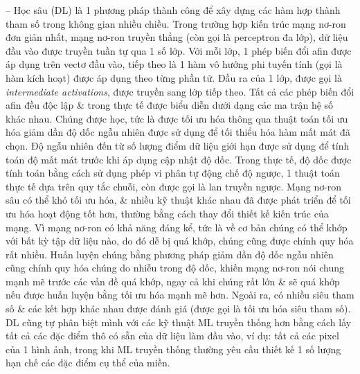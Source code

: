 \documentclass{article}
\begin{document}
\begin{itemize}
\begin{itemize}
\begin{itemize}
            -- Học sâu (DL) là 1 phương pháp thành công để xây dựng các hàm hợp thành tham số trong không gian nhiều chiều. Trong trường hợp kiến trúc mạng nơ-ron đơn giản nhất, mạng nơ-ron truyền thẳng (còn gọi là perceptron đa lớp), dữ liệu đầu vào được truyền tuần tự qua 1 số lớp. Với mỗi lớp, 1 phép biến đổi afin được áp dụng trên vectơ đầu vào, tiếp theo là 1 hàm vô hướng phi tuyến tính (gọi là hàm kích hoạt) được áp dụng theo từng phần tử. Đầu ra của 1 lớp, được gọi là {\it intermediate activations}, được truyền sang lớp tiếp theo. Tất cả các phép biến đổi afin đều độc lập \& trong thực tế được biểu diễn dưới dạng các ma trận hệ số khác nhau. Chúng được học, tức là được tối ưu hóa thông qua thuật toán tối ưu hóa giảm dần độ dốc ngẫu nhiên được sử dụng để tối thiểu hóa hàm mất mát đã chọn. Độ ngẫu nhiên đến từ số lượng điểm dữ liệu giới hạn được sử dụng để tính toán độ mất mát trước khi áp dụng cập nhật độ dốc. Trong thực tế, độ dốc được tính toán bằng cách sử dụng phép vi phân tự động chế độ ngược, 1 thuật toán thực tế dựa trên quy tắc chuỗi, còn được gọi là lan truyền ngược. Mạng nơ-ron sâu có thể khó tối ưu hóa, \& nhiều kỹ thuật khác nhau đã được phát triển để tối ưu hóa hoạt động tốt hơn, thường bằng cách thay đổi thiết kế kiến trúc của mạng. Vì mạng nơ-ron có khả năng đáng kể, tức là về cơ bản chúng có thể khớp với bất kỳ tập dữ liệu nào, do đó dễ bị quá khớp, chúng cũng được chính quy hóa rất nhiều. Huấn luyện chúng bằng phương pháp giảm dần độ dốc ngẫu nhiên cũng chính quy hóa chúng do nhiễu trong độ dốc, khiến mạng nơ-ron nói chung mạnh mẽ trước các vấn đề quá khớp, ngay cả khi chúng rất lớn \& sẽ quá khớp nếu được huấn luyện bằng tối ưu hóa mạnh mẽ hơn. Ngoài ra, có nhiều siêu tham số \& các kết hợp khác nhau được đánh giá (được gọi là tối ưu hóa siêu tham số). DL cũng tự phân biệt mình với các kỹ thuật ML truyền thống hơn bằng cách lấy tất cả các đặc điểm thô có sẵn của dữ liệu làm đầu vào, ví dụ: tất cả các pixel của 1 hình ảnh, trong khi ML truyền thống thường yêu cầu thiết kế 1 số lượng hạn chế các đặc điểm cụ thể của miền.


\end{itemize}
\end{itemize}
\end{itemize}
\end{document}
